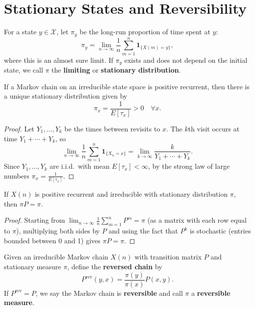 \documentclass{ximera}
\begin{document}
\section*{Stationary States and Reversibility}

\begin{definition}
For a state $y \in \mathcal{X}$, let $\pi_y$ be the long-run proportion of time spent at $y$:
\[
\pi_y = \lim_{n \to \infty} \frac{1}{n} \sum_{m=1}^{n} \mathbf{1}_{\{X(m)=y\}},
\]
where this is an almost sure limit. If $\pi_y$ exists and does not depend on the initial state, we call $\pi$ the \textbf{limiting} or \textbf{stationary distribution}.
\end{definition}

\begin{proposition}
If a Markov chain on an irreducible state space is positive recurrent, then there is a unique stationary distribution given by
\[
\pi_x = \frac{1}{E[\tau_x]} > 0 \quad \forall x.
\]
\end{proposition}

\begin{proof}
Let $Y_1, \ldots, Y_k$ be the times between revisits to $x$. The $k$th visit occurs at time $Y_1 + \cdots + Y_k$, so
\[
\lim_{n \to \infty} \frac{1}{n} \sum_{m=1}^{n} \mathbf{1}_{\{X_n = x\}} = \lim_{k \to \infty} \frac{k}{Y_1 + \cdots + Y_k}.
\]
Since $Y_1, \ldots, Y_k$ are i.i.d.\ with mean $E[\tau_x] < \infty$, by the strong law of large numbers $\pi_x = \frac{1}{E[\tau_x]}$.
\end{proof}

\begin{proposition}
If $X(n)$ is positive recurrent and irreducible with stationary distribution $\pi$, then $\pi P = \pi$.
\end{proposition}

\begin{proof}
Starting from $\lim_{n\to\infty} \frac{1}{n} \sum_{m=1}^n P^m = \pi$ (as a matrix with each row equal to $\pi$), multiplying both sides by $P$ and using the fact that $P^k$ is stochastic (entries bounded between 0 and 1) gives $\pi P = \pi$.
\end{proof}

\begin{definition}
Given an irreducible Markov chain $X(n)$ with transition matrix $P$ and stationary measure $\pi$, define the \textbf{reversed chain} by
\[
P^{\text{rev}}(y, x) = \frac{\pi(y)}{\pi(x)} P(x, y).
\]
If $P^{\text{rev}} = P$, we say the Markov chain is \textbf{reversible} and call $\pi$ a \textbf{reversible measure}.
\end{definition}
\end{document}
